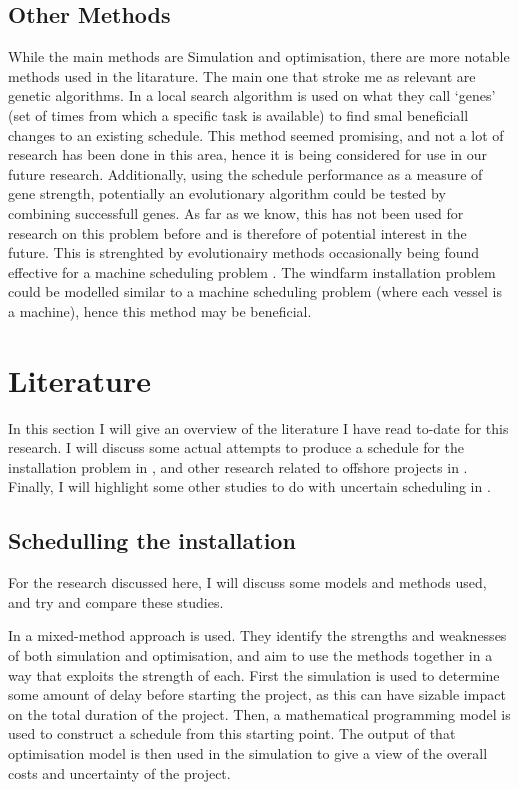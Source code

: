 \documentclass[a4paper,12pt]{article}
\begin{document}
\subsection{Other Methods} \label{ss:otmet}
While the main methods are Simulation and optimisation, there are more notable methods used in the litarature. The main one that stroke me as relevant are genetic algorithms. In \cite{kerkhove2017optimised} a local search algorithm is used on what they call `genes' (set of times from which a specific task is available) to find smal beneficiall changes to an existing schedule. This method seemed promising, and not a lot of research has been done in this area, hence it is being considered for use in our future research. Additionally, using the schedule performance as a measure of gene strength, potentially an evolutionary algorithm could be tested by combining successfull genes. As far as we know, this has not been used for research on this problem before and is therefore of potential interest in the future. This is strenghted by evolutionairy methods occasionally being found effective for a machine scheduling problem \cite{dorndorf1995evolution}. The windfarm installation problem could be modelled similar to a machine scheduling problem (where each vessel is a machine), hence this method may be beneficial.


\pagebreak

\section{Literature} \label{s:lit}
In this section I will give an overview of the literature I have read to-date for this research. I will discuss some actual attempts to produce a schedule for the installation problem in , and other research related to offshore projects in . Finally, I will highlight some other studies to do with uncertain scheduling in .  

\subsection{Schedulling the installation} \label{ss:sched}
For the research discussed here, I will discuss some models and methods used, and try and compare these studies. 

\bigskip

In \cite{barlow2018mixed} a mixed-method approach is used. They identify the strengths and weaknesses of both simulation and optimisation, and aim to use the methods together in a way that exploits the strength of each. First the simulation is used to determine some amount of delay before starting the project, as this can have sizable impact on the total duration of the project. Then, a mathematical programming model is used to construct a schedule from this starting point. The output of that optimisation model is then used in the simulation to give a view of the overall costs and uncertainty of the project. 
\end{document}
